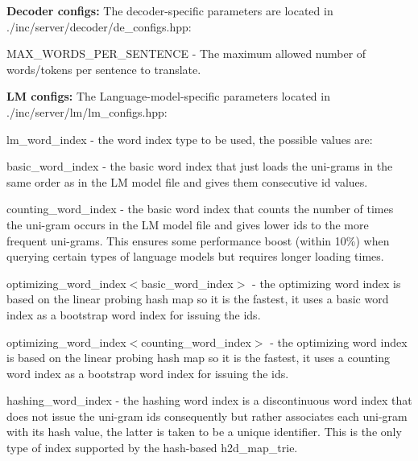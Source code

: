 {\bfseries Decoder configs\+:} The decoder-\/specific parameters are located in {\ttfamily ./inc/server/decoder/de\+\_\+configs.hpp}\+:


\begin{DoxyItemize}
\item {\ttfamily M\+A\+X\+\_\+\+W\+O\+R\+D\+S\+\_\+\+P\+E\+R\+\_\+\+S\+E\+N\+T\+E\+N\+C\+E} -\/ The maximum allowed number of words/tokens per sentence to translate.
\end{DoxyItemize}

{\bfseries L\+M configs\+:} The Language-\/model-\/specific parameters located in {\ttfamily ./inc/server/lm/lm\+\_\+configs.hpp}\+:


\begin{DoxyItemize}
\item {\ttfamily lm\+\_\+word\+\_\+index} -\/ the word index type to be used, the possible values are\+:
\begin{DoxyItemize}
\item {\ttfamily basic\+\_\+word\+\_\+index} -\/ the basic word index that just loads the uni-\/grams in the same order as in the L\+M model file and gives them consecutive id values.
\item {\ttfamily counting\+\_\+word\+\_\+index} -\/ the basic word index that counts the number of times the uni-\/gram occurs in the L\+M model file and gives lower ids to the more frequent uni-\/grams. This ensures some performance boost (within 10\%) when querying certain types of language models but requires longer loading times.
\item {\ttfamily optimizing\+\_\+word\+\_\+index$<$basic\+\_\+word\+\_\+index$>$} -\/ the optimizing word index is based on the linear probing hash map so it is the fastest, it uses a basic word index as a bootstrap word index for issuing the ids.
\item {\ttfamily optimizing\+\_\+word\+\_\+index$<$counting\+\_\+word\+\_\+index$>$} -\/ the optimizing word index is based on the linear probing hash map so it is the fastest, it uses a counting word index as a bootstrap word index for issuing the ids.
\item {\ttfamily hashing\+\_\+word\+\_\+index} -\/ the hashing word index is a discontinuous word index that does not issue the uni-\/gram ids consequently but rather associates each uni-\/gram with its hash value, the latter is taken to be a unique identifier. This is the only type of index supported by the hash-\/based {\ttfamily h2d\+\_\+map\+\_\+trie}.
\end{DoxyItemize}

\end{DoxyItemize}
